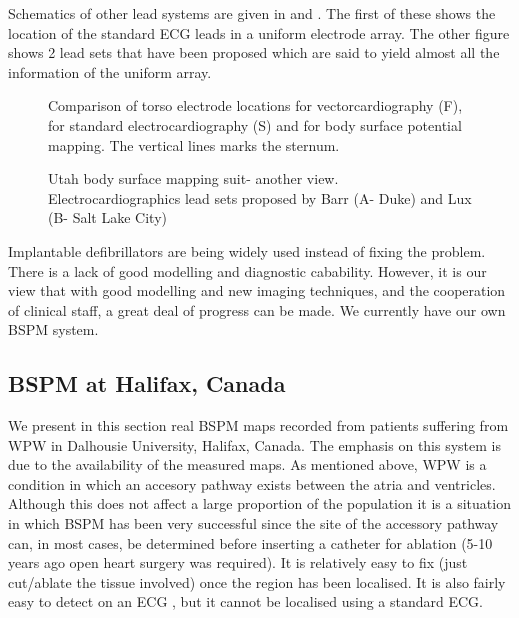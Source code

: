 Schematics of other lead systems are given in  and
. The first of these shows the location of the standard
ECG leads in a uniform electrode array.  The other figure shows 2 lead sets
that have been proposed which are said to yield almost all the information of
the uniform array. 

\begin{figure}[htbp] \centering
  \caption[Schematic of uniform lead set]{Comparison of torso electrode
    locations for vectorcardiography (F), for standard electrocardiography (S)
    and for body surface potential mapping.  The vertical lines marks the
    sternum.}
  \label{fig:vcg-bspm}
\end{figure}

\begin{figure}[htbp] \centering
  \caption[Various BSPM electrode locations]{Utah body surface
    mapping suit- another view. Electrocardiographics lead sets proposed by Barr
    (A- Duke) and Lux (B- Salt Lake City) }
  \label{fig:bspm-leads}
\end{figure}

Implantable defibrillators are being widely used
instead of fixing the problem. There is a lack of good modelling and diagnostic
cabability. However, it is our view that with good modelling and new imaging techniques, and the
cooperation of clinical staff, a great deal of progress can be made. We
currently have our own BSPM system.

\subsection{BSPM at Halifax, Canada}
We present in this section real BSPM maps recorded from patients suffering
from WPW in Dalhousie University, Halifax, Canada.  
The emphasis on this system is due to the
availability of the measured maps.  As mentioned above, WPW is a condition in
which an accesory pathway exists between the atria and ventricles. Although this does not affect a large proportion of the population it is a
situation in which BSPM has been very successful since the site of the
accessory pathway can, in most cases, be determined before inserting a
catheter for ablation (5-10 years ago open heart surgery was required).
 It is
relatively easy to fix (just cut/ablate the tissue involved) once the region
has been localised.  It is also fairly easy to detect on an ECG
,  but it cannot be localised
using a standard ECG.

